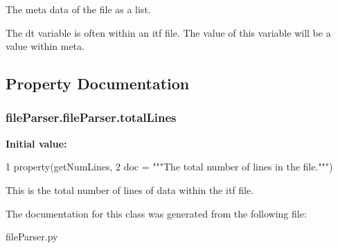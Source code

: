 The meta data of the file as a list. 

The dt variable is often within an itf file. The value of this variable will be a value within meta. 

\subsection{Property Documentation}
\hypertarget{classfile_parser_1_1file_parser_ad7d86e199f948e8ce19303dc875bb32f}{
\subsubsection[{total\-Lines}]{\setlength{\rightskip}{0pt plus 5cm}file\-Parser.\-file\-Parser.\-total\-Lines\hspace{0.3cm}{\ttfamily [static]}}}\label{classfile_parser_1_1file_parser_ad7d86e199f948e8ce19303dc875bb32f}
{\bfseries Initial value\-:}
\begin{DoxyCode}
1 property(getNumLines,
2                doc = \textcolor{stringliteral}{"""The total number of lines in the file."""})
\end{DoxyCode}


This is the total number of lines of data within the itf file. 



The documentation for this class was generated from the following file\-:\begin{DoxyCompactItemize}
\item 
file\-Parser.\-py\end{DoxyCompactItemize}
